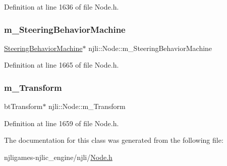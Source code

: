 Definition at line 1636 of file Node.\+h.

\mbox{\label{classnjli_1_1_node_a6b21e06dc194ce9478cb7d48652b6f7f}} 
\subsubsection{\texorpdfstring{m\+\_\+\+Steering\+Behavior\+Machine}{m\_SteeringBehaviorMachine}}
{\footnotesize\ttfamily \mbox{\hyperlink{classnjli_1_1_steering_behavior_machine}{Steering\+Behavior\+Machine}}$\ast$ njli\+::\+Node\+::m\+\_\+\+Steering\+Behavior\+Machine\hspace{0.3cm}{\ttfamily [private]}}



Definition at line 1665 of file Node.\+h.

\mbox{\label{classnjli_1_1_node_a8ec7076cfda5578b99c9f582a0beb4eb}} 
\subsubsection{\texorpdfstring{m\+\_\+\+Transform}{m\_Transform}}
{\footnotesize\ttfamily bt\+Transform$\ast$ njli\+::\+Node\+::m\+\_\+\+Transform\hspace{0.3cm}{\ttfamily [private]}}



Definition at line 1659 of file Node.\+h.



The documentation for this class was generated from the following file\+:\begin{DoxyCompactItemize}
\item 
njligames-\/njlic\+\_\+engine/njli/\mbox{\hyperlink{_node_8h}{Node.\+h}}\end{DoxyCompactItemize}
